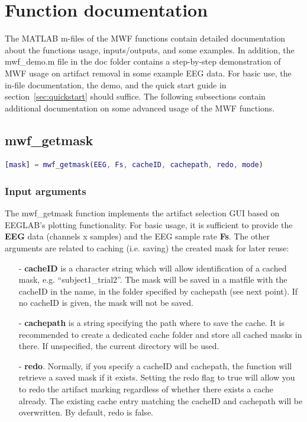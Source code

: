 \documentclass[11pt]{article}
\begin{document}
\section{Function documentation}

The MATLAB m-files of the MWF functions contain detailed documentation about the functions usage, inputs/outputs, and some examples. In addition, the mwf\_demo.m file in the doc folder contains a step-by-step demonstration of MWF usage on artifact removal in some example EEG data. For basic use, the in-file documentation, the demo, and the quick start guide in section~\ref{sec:quickstart} should suffice. The following subsections contain additional documentation on some advanced usage of the MWF functions.

\subsection{mwf\_getmask}

\begin{lstlisting}[frame=single, language=matlab]
[mask] = mwf_getmask(EEG, Fs, cacheID, cachepath, redo, mode)
\end{lstlisting}

\subsubsection{Input arguments}

The mwf\_getmask function implements the artifact selection GUI based on EEGLAB's plotting functionality. For basic usage, it is sufficient to provide the \textbf{EEG} data (channels x samples) and the EEG sample rate \textbf{Fs}. The other arguments are related to caching (i.e. saving) the created mask for later reuse:

\begin{itemize}[noitemsep]
\item[-] \textbf{cacheID} is a character string which will allow identification of a cached mask, e.g. ``subject1\_trial2''. The mask will be saved in a matfile with the cacheID in the name, in the folder specified by cachepath (see next point). If no cacheID is given, the mask will not be saved.
\item[-] \textbf{cachepath} is a string specifying the path where to save the cache. It is recommended to create a dedicated cache folder and store all cached masks in there. If unspecified, the current directory will be used.
\item[-] \textbf{redo}. Normally, if you specify a cacheID and cachepath, the function will retrieve a saved mask if it exists. Setting the redo flag to true will allow you to redo the artifact marking regardless of whether there exists a cache already. The existing cache entry matching the cacheID and cachepath will be overwritten. By default, redo is false.
\end{itemize}
\end{document}
